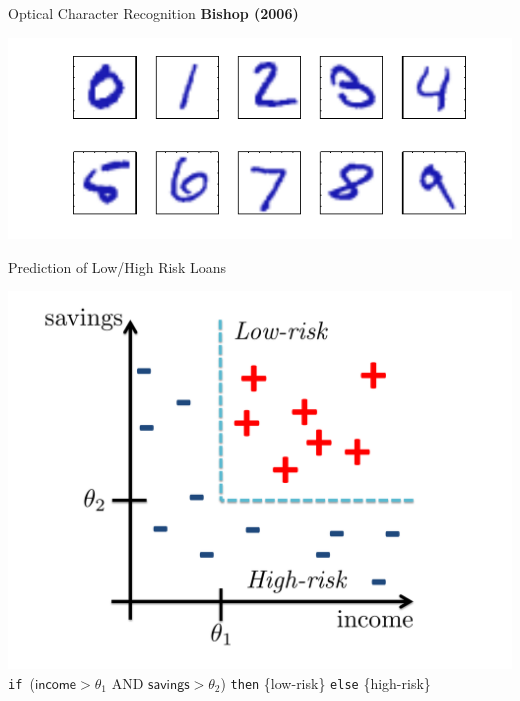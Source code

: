\documentclass[aspectratio=169,xcolor=dvipsnames,svgnames,x11names,fleqn]{beamer}
\begin{document}
\begin{frame}{Optical Character Recognition}
  {\small\bf\color{MediumBlue}Bishop (2006)}
  \begin{center}
    \includegraphics[width=\textwidth]{figures/intro-Figure11.pdf}\\
  \end{center}
\end{frame}


\begin{frame}{Prediction of Low/High Risk Loans}
  \begin{center}
    \includegraphics[height=.6\textheight]{figures/intro-loan.pdf}\\
    \texttt{if }($\textsf{income} > \theta_1$ AND $\textsf{savings} > \theta_2$) 
      \texttt{then} \{low-risk\} \texttt{else} \{high-risk\} 
  \end{center}
\end{frame}
\end{document}
